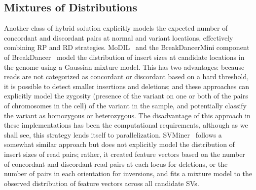 \subsection{Mixtures of Distributions}\label{section_mixture_of_distributions}

Another class of hybrid solution explicitly models the expected number of concordant and discordant pairs at normal and variant locations, effectively combining RP and RD strategies. MoDIL~\cite{Lee:2009da} and the BreakDancerMini component of BreakDancer~\cite{Chen:2009p3} model the distribution of insert sizes at candidate locations in the genome using a Gaussian mixture model. This has two advantages: because reads are not categorized as concordant or discordant based on a hard threshold, it is possible to detect smaller insertions and deletions; and these approaches can explicitly model the zygosity (presence of the variant on one or both of the pairs of chromosomes in the cell) of the variant in the sample, and potentially classify the variant as homozygous or heterozygous. The disadvantage of this approach in these implementations has been the computational requirements, although as we shall see, this strategy lends itself to parallelization. SVMiner~\cite{Hayes:2012ia} follows a somewhat similar approach but does not explicitly model the distribution of insert sizes of read pairs; rather, it created feature vectors based on the number of concordant and discordant read pairs at each locus for deletions, or the number of pairs in each orientation for inversions, and fits a mixture model to the observed distribution of feature vectors across all candidate SVs.
